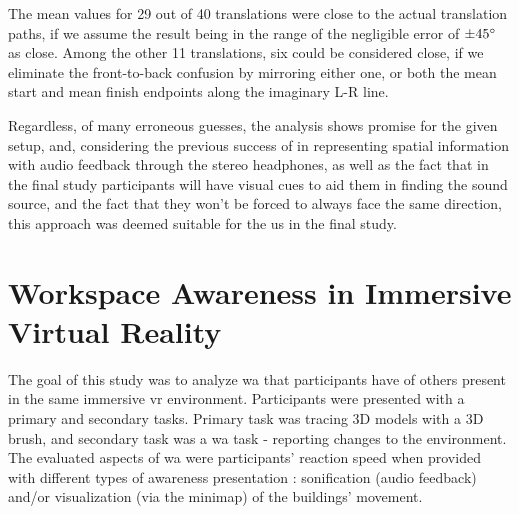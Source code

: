The mean values for 29 out of 40 translations were close to the actual translation paths, if we assume the result being in the range of the negligible error of $\pm 45\degree$ as close. %
Among the other 11 translations, six could be considered close, if we eliminate the front-to-back confusion by mirroring either one, or both the mean start and mean finish endpoints along the imaginary L-R line.

Regardless, of many erroneous guesses, the analysis shows promise for the given setup, and, considering the previous success of \cite{gutwin_chalk_2011} in representing spatial information with audio feedback through the stereo headphones, as well as the fact that in the final study participants will have visual cues to aid them in finding the sound source, and the fact that they won't be forced to always face the same direction, this approach was deemed suitable for the us in the final study.
















\section{Workspace Awareness in Immersive Virtual Reality}
\label{final_study}

The goal of this study was to analyze \gls{wa} that participants have of others present in the same immersive \gls{vr} environment. Participants were presented with a primary and secondary tasks. Primary task was tracing 3D models with a 3D brush, and secondary task was a \gls{wa} task - reporting changes to the environment.
The evaluated aspects of \gls{wa} were participants’ reaction speed when provided with different types of awareness presentation : sonification (audio feedback) and/or visualization (via the minimap) of the buildings' movement.

